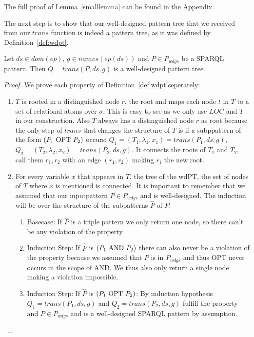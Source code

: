 The full proof of Lemma~\ref{smalllemma} can be found in the Appendix. 

The next step is to show that our well-designed pattern tree that we received
from our $trans$ function is indeed a pattern tree, as it was defined by Definition~\ref{def:wdpt}.

\begin{lemma}
	Let $ds \in dom(ep)$, $g \in names(ep(ds))$ and $P \in P_{wdgs}$ be a SPARQL pattern.
	Then $Q = trans(P,ds,g)$ is a well-designed pattern tree. 
\end{lemma}

\begin{proof}
	We prove each property of Definition~\ref{def:wdpt}seperately:
	\begin{enumerate}
		\item $T$ is rooted in a distinguished node $r$, the root and maps
			each node $t$ in  $T$ to a set of relational atoms over $\sigma$:
			This is easy to see as we only use $LOC$ and $T$ in our
			construction. Also $T$ always has a distinguished node $r$ as root
			because the only step of $trans$ that changes the structure of $T$
			is if a subppattern of the form $(P_1 \mbox{ OPT } P_2)$ occurs: 
			$Q_1 = (T_1,\lambda_1,x_1)  = trans(P_1,ds,g)$,
			$Q_2 = (T_2,\lambda_2,x_2)  = trans(P_2,ds,g)$. 
			It connects the roots of $T_1$ and $T_2$, call them $r_1,r_2$ with
			an edge $(r_1,r_2)$ making $r_1$ the new root.  

		\item For every variable $x$ that appears
			in $T$, the tree of the wdPT, the set of nodes of $T$ where $x$ is mentioned is connected.
			It is important to remember that we assumed that our inputpattern $P
			\in P_{wdgs}$ and is well-designed.
			The induction will be over the structure of the subpatterns $\hat{P}$ of $P$.
			\begin{enumerate}
			
				\item Basecase: If $\hat{P}$ is a triple pattern we only return one node, so there can't be any
					violation of the property.

				\item Induction Step: If $\hat{P}$ is $(P_1 \mbox{ AND }  P_2)$ there can 
					also never be a violation of the
					property because we assumed that $P$ is in $P_{wdgs}$ and thus OPT never
					occurs in the scope of AND. We thus also only return a single node making a
					violation impossible.

				\item Induction Step: If $\hat{P}$ is $(P_1 \mbox{ OPT }  P_2)$:
					By induction hypothesis $Q_1 = trans(P_1,ds,g)$ and $Q_2 =
					trans(P_2,ds,g)$ fulfill the property and $P \in P_{wdgs}$ 
					and is a well-designed SPARQL pattern by assumption. 


\end{enumerate}
\end{enumerate}
\end{proof}
